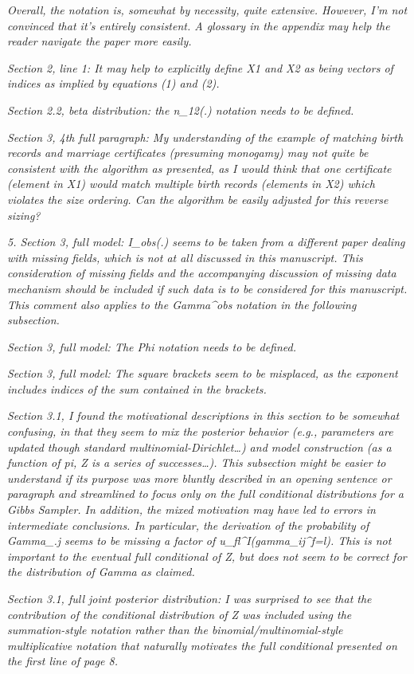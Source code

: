 \documentclass[letterpaper, parskip]{scrartcl}
\newcommand{\pointRaised}[1]{%
	\begin{tcolorbox}
		\itshape #1
	\end{tcolorbox}
}
\begin{document}
		\pointRaised{%
Overall, the notation is, somewhat by necessity, quite extensive. However, I’m not convinced
that it’s entirely consistent. A glossary in the appendix may help the reader navigate the paper
more easily.
	}

		\pointRaised{%
Section 2, line 1: It may help to explicitly define X1 and X2 as being vectors of indices as implied
by equations (1) and (2).
}
		\pointRaised{%
Section 2.2, beta distribution: the n_{12}(.) notation needs to be defined.
}

		\pointRaised{%
Section 3, 4th full paragraph: My understanding of the example of matching birth records and
marriage certificates (presuming monogamy) may not quite be consistent with the algorithm as
presented, as I would think that one certificate (element in X1) would match multiple birth
records (elements in X2) which violates the size ordering. Can the algorithm be easily adjusted
for this reverse sizing?
}
		\pointRaised{%
5. Section 3, full model: I_obs(.) seems to be taken from a different paper dealing with missing
fields, which is not at all discussed in this manuscript. This consideration of missing fields and
the accompanying discussion of missing data mechanism should be included if such data is to be
considered for this manuscript. This comment also applies to the Gamma^{obs} notation in the
following subsection.
}
		\pointRaised{%
Section 3, full model: The Phi notation needs to be defined.
}
		\pointRaised{%
Section 3, full model: The square brackets seem to be misplaced, as the exponent includes
indices of the sum contained in the brackets.
}
		\pointRaised{%
Section 3.1, I found the motivational descriptions in this section to be somewhat confusing, in
that they seem to mix the posterior behavior (e.g., parameters are updated though standard
multinomial-Dirichlet…) and model construction (as a function of pi, Z is a series of successes…).
This subsection might be easier to understand if its purpose was more bluntly described in an
opening sentence or paragraph and streamlined to focus only on the full conditional
distributions for a Gibbs Sampler. In addition, the mixed motivation may have led to errors in
intermediate conclusions. In particular, the derivation of the probability of Gamma_{.j} seems
to be missing a factor of u_{fl}^I(gamma_{ij}^f=l). This is not important to the eventual full
conditional of Z, but does not seem to be correct for the distribution of Gamma as claimed.
}
		\pointRaised{%
Section 3.1, full joint posterior distribution: I was surprised to see that the contribution of the
conditional distribution of Z was included using the summation-style notation rather than the
binomial/multinomial-style multiplicative notation that naturally motivates the full conditional
presented on the first line of page 8.
}
\end{document}
